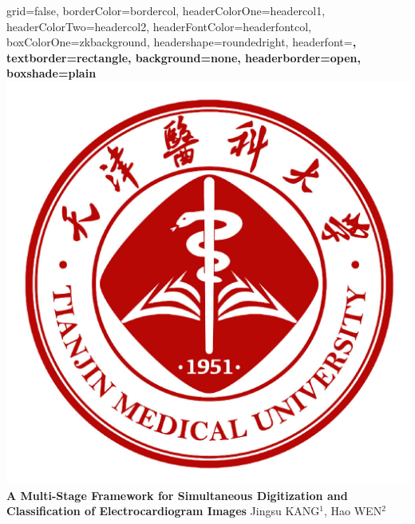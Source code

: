 \documentclass[a0paper,portrait]{baposter}
\begin{document}

\begin{poster}{
grid=false,
borderColor=bordercol, %
headerColorOne=headercol1, %
headerColorTwo=headercol2, %
headerFontColor=headerfontcol, %
boxColorOne=zkbackground,
headershape=roundedright, %
headerfont=\Large\sf\bf, %
textborder=rectangle,
background=none,
headerborder=open, %
boxshade=plain
}
%
%
{\includegraphics[scale=0.101]{logo_tmu.jpeg}} %
{
{\bf \fontsize{19pt}{19pt} \selectfont A Multi-Stage Framework for Simultaneous Digitization and Classification of Electrocardiogram Images}
} %
{\vspace{0.3em} \smaller Jingsu KANG$^1$, Hao WEN$^2$  \\  %

}
\end{poster}
\end{document}
